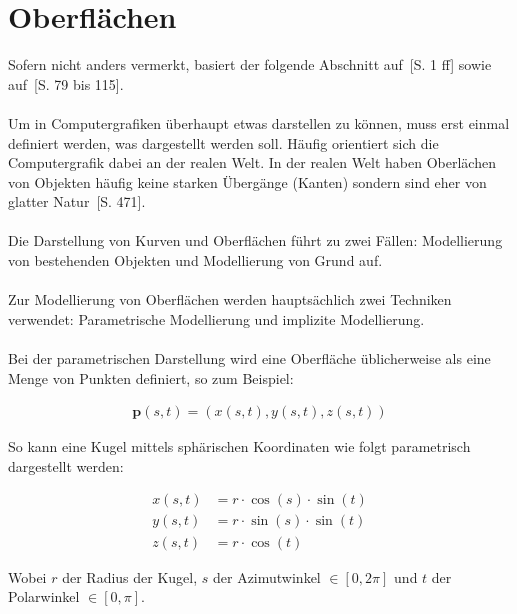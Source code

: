 
\section{Oberflächen}
\label{sec:surfaces}

Sofern nicht anders vermerkt, basiert der folgende Abschnitt
auf~\cite{division_introduction_1996}[S. 1 ff] sowie
auf~\cite{glassner_introduction_1989}[S. 79 bis 115].\\
\\
Um in Computergrafiken überhaupt etwas darstellen zu können, muss erst einmal
definiert werden, was dargestellt werden soll. Häufig orientiert sich die
Computergrafik dabei an der realen Welt.  In der realen Welt haben Oberlächen
von Objekten häufig keine starken Übergänge (Kanten) sondern sind eher von
glatter Natur~\cite{foley_computer_1996}[S. 471].\\
\\
Die Darstellung von Kurven und Oberflächen führt zu zwei Fällen: Modellierung
von bestehenden Objekten und Modellierung von Grund auf.\\
\\
Zur Modellierung von Oberflächen werden hauptsächlich zwei Techniken verwendet:
Parametrische Modellierung und implizite Modellierung.\\
\\
Bei der parametrischen Darstellung wird eine Oberfläche üblicherweise als
eine Menge von Punkten definiert, so zum Beispiel:

\begin{gather}\label{eq:surface_parametric}
    \bm{p}(s, t) = (x(s, t), y(s, t), z(s, t))
\end{gather}

So kann eine Kugel mittels sphärischen Koordinaten wie
folgt parametrisch dargestellt werden:

\begin{align}\label{eq:sphere_parametric}
    x(s, t) &= r \cdot \cos(s) \cdot \sin(t) \\
    y(s, t) &= r \cdot \sin(s) \cdot \sin(t) \\
    z(s, t) &= r \cdot \cos(t)
\end{align}

Wobei $r$ der Radius der Kugel, $s$ der Azimutwinkel $\in [0, 2\pi]$ und
$t$ der Polarwinkel $\in [0, \pi]$.

